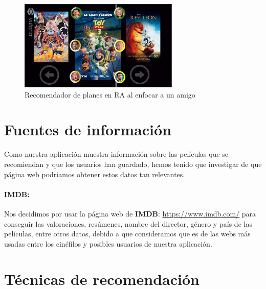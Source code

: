 \begin{flushleft}
    \begin{figure}[H]
        \centering
        \includegraphics[width=3in, angle=270]{figures/chapter-2/recomendadorAR.JPG}
        \caption{Recomendador de planes en RA al enfocar a un amigo}
    \end{figure}
    
\end{flushleft}
\newpage
\section{Fuentes de información}
\label{makereference2.5}
Como nuestra aplicación muestra información sobre las películas que se recomiendan y que los usuarios han guardado, hemos
tenido que investigar de que página web podríamos obtener estos datos tan relevantes.
\paragraph{IMDB:}
Nos decidimos por usar la página web de \textbf{IMDB}: \url{https://www.imdb.com/} para conseguir las valoraciones, resúmenes, nombre del director,
género y país de las películas, entre otros datos, debido a que consideramos que es de las webs más usadas entre los cinéfilos y posibles 
usuarios de nuestra aplicación.

\section{Técnicas de recomendación}
\label{makereference2.6}



